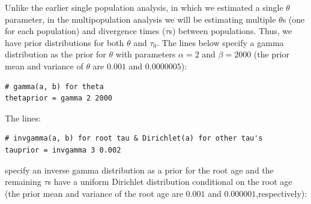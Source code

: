 \documentclass{book}
\numberwithin{equation}{section} \renewcommand{\baselinestretch}{0.55}
\begin{document}
Unlike the earlier single population analysis, in which we estimated a
single $\theta$ parameter, in the multipopulation analysis we will be
estimating multiple $\theta$s (one for each population) and divergence
times ($\tau$s) between populations. Thus, we have prior distributions
for both $\theta$ and $\tau_0$. The lines below specify a gamma distribution
as the prior for $\theta$ with parameters $\alpha = 2$ and $\beta = 2000$
(the prior mean and variance of $\theta$ are $0.001$ and $0.0000005$):
\begin{verbatim}
# gamma(a, b) for theta
thetaprior = gamma 2 2000 
\end{verbatim}
The lines:
\begin{verbatim}
# invgamma(a, b) for root tau & Dirichlet(a) for other tau's
tauprior = invgamma 3 0.002 
\end{verbatim}
specify an inverse gamma distribution as a prior for
the root age and the remaining $\tau$s have a uniform Dirichlet
distribution conditional on the root age (the prior mean and variance of the
root age are $0.001$ and $0.000001$,respectively):

\newpage
\end{document}
